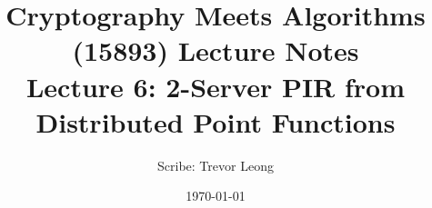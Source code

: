 \documentclass[11pt]{article}
\title{{\Large Cryptography Meets Algorithms (15893) Lecture Notes}\\[5pt]
{\bf Lecture 6: 2-Server PIR from Distributed Point Functions}}
\author{Scribe: Trevor Leong}
\date{\today}
\begin{document}
\maketitle


{

}


\end{document}

